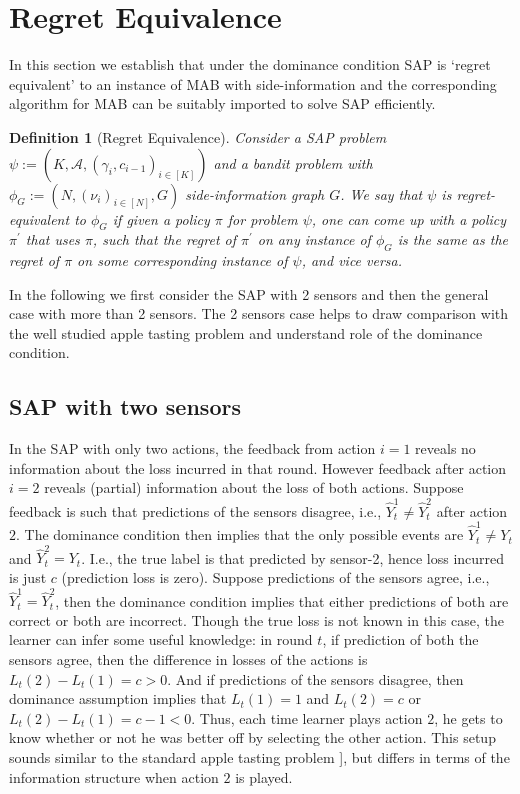 \documentclass{article}
\newtheorem{definition}{Definition}
\begin{document}
 \section{Regret Equivalence}
In this section we establish that under the dominance condition SAP is `regret equivalent' to an instance of MAB with side-information and the corresponding algorithm for MAB can be suitably imported to solve SAP efficiently.   
 \noindent
\begin{definition}[Regret Equivalence]
	Consider a SAP problem $\psi:=(K, \mathcal{A}, (\gamma_i,c_{i-1})_{i\in [K]})$ and a bandit problem with $\phi_G:=(N, (\nu_i)_{i \in [N]},G)$ side-information graph $G$. We say that $\psi$ is regret-equivalent to $\phi_G$ if given a policy $\pi$ for problem $\psi$, one can come up with a policy $\pi^\prime$ that uses $\pi$, such that the regret of $\pi^\prime$ on any instance of $\phi_G$ is the same as the regret of $\pi$ on some corresponding instance of $\psi$, and vice versa. 
\end{definition}	
In the following we first consider the SAP with 2 sensors and then the general case with more than 2 sensors. The 2 sensors case helps to draw comparison with the well studied apple tasting problem and understand role of the dominance condition. 
\subsection{SAP with two sensors}
In the SAP with only two actions, the feedback from action $i=1$ reveals no information about the loss incurred in that round. However feedback after action $i=2$ reveals (partial) information about the loss of both actions. Suppose feedback is such that predictions of the sensors disagree, i.e., ${\hat{Y}^1_t\neq\hat{Y}^2_t}$ after action $2$.  The dominance condition then implies that the only possible events are $\hat{Y}^1_t \neq Y_t$ and $\hat{Y}^2_t=Y_t$. I.e., the true label is that predicted by sensor-2, hence loss incurred is just $c$ (prediction loss is zero). Suppose predictions of the sensors agree, i.e., ${\hat{Y}^1_t = \hat{Y}^2_t}$, then the dominance condition implies that either predictions of both are correct or both are incorrect. Though the true loss is not known in this case, the learner can infer some useful knowledge: in round $t$, if prediction of both the sensors agree, then the difference in losses of the actions is $L_t(2)-L_t(1)=c>0$. And if predictions of the sensors disagree, then dominance assumption implies that $L_t(1)=1$ and $L_t(2)=c$ or $L_t(2)-L_t(1)=c-1<0$. Thus, each time learner plays action $2$, he gets to know whether or not he was better off by selecting the other action. This setup sounds similar to the standard apple tasting problem \cite{IC2000_AppleTasting_HelmboldLittlestoneLong}
], but differs in terms of the information structure when action $2$ is played. 
\end{document}
